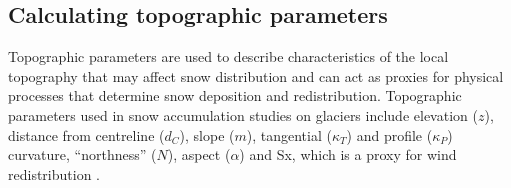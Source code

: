 \documentclass[12pt]{article}
\begin{document}
\begin{figure}
  \label{fig:finalDEM}
\end{figure}

\subsection{Calculating topographic parameters}
\label{sec:topoCalc}

Topographic parameters are used to describe characteristics of the local topography that may affect snow distribution and can act as proxies for physical processes that determine snow deposition and redistribution. Topographic parameters used in snow accumulation studies on glaciers include elevation ($z$), distance from centreline ($d_C$), slope ($m$), tangential ($\kappa_T$) and profile ($\kappa_P$) curvature, ``northness'' ($N$), aspect ($\alpha$) and Sx, which is a proxy for wind redistribution \citep{Basist1994, Revuelto2014, McGrath2015}.	
 
\end{document}
